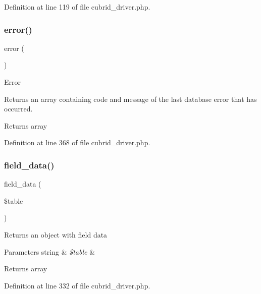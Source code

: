 Definition at line 119 of file cubrid\+\_\+driver.\+php.

\mbox{\label{class_c_i___d_b__cubrid__driver_a43b8d30b879d4f09ceb059b02af2bc02}} 
\subsubsection{\texorpdfstring{error()}{error()}}
{\footnotesize\ttfamily error (\begin{DoxyParamCaption}{ }\end{DoxyParamCaption})}

Error

Returns an array containing code and message of the last database error that has occurred.

\begin{DoxyReturn}{Returns}
array 
\end{DoxyReturn}


Definition at line 368 of file cubrid\+\_\+driver.\+php.

\mbox{\label{class_c_i___d_b__cubrid__driver_a90355121e1ed009e0efdbd544ab56efa}} 
\subsubsection{\texorpdfstring{field\_data()}{field\_data()}}
{\footnotesize\ttfamily field\+\_\+data (\begin{DoxyParamCaption}\item[{}]{\$table }\end{DoxyParamCaption})}

Returns an object with field data


\begin{DoxyParams}[1]{Parameters}
string & {\em \$table} & \\
\hline
\end{DoxyParams}
\begin{DoxyReturn}{Returns}
array 
\end{DoxyReturn}


Definition at line 332 of file cubrid\+\_\+driver.\+php.

